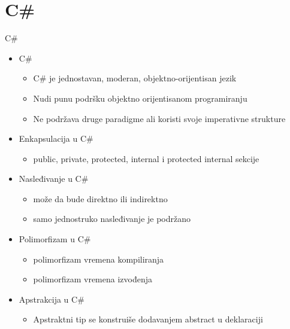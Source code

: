 \documentclass[14pt,aspectratio=169]{beamer}
\begin{document}
\section{C\#}
\begin{frame}[fragile]{C\#}
\begin{itemize}
\item C\# 
	\begin{itemize}
		\item C\# je jednostavan, moderan, objektno-orijentisan jezik
		\item Nudi punu podršku objektno orijentisanom programiranju
		\item Ne podržava druge paradigme ali koristi svoje imperativne strukture
	\end{itemize}
\item Enkapsulacija u C\#
	\begin{itemize}
		\item public, private, protected, internal i protected internal sekcije
	\end{itemize}
\item Nasleđivanje u C\#
	\begin{itemize}
		\item može da bude direktno ili indirektno
		\item samo jednostruko nasleđivanje je podržano
	\end{itemize}
\item Polimorfizam u C\#
	\begin{itemize}
		\item polimorfizam vremena kompiliranja
		\item polimorfizam vremena izvođenja
	\end{itemize}
\item Apstrakcija u C\#
         \begin{itemize} 
		\item Apstraktni tip se konstruiše dodavanjem abstract u deklaraciji
	\end{itemize}
\end{itemize}
\end{frame}
\end{document}
